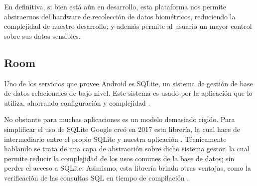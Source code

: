             En definitiva, si bien está aún en desarrollo, esta plataforma nos permite abstraernos del hardware de
            recolección de datos biométricos, reduciendo la complejidad de nuestro desarrollo; y además permite al 
            usuario un mayor control sobre sus datos sensibles.
            
        \subsection{Room}
            Uno de los servicios que provee Android es SQLite, un sistema de gestión de base de datos relacionales de 
            bajo nivel. Este sistema es usado por la aplicación que lo utiliza, ahorrando configuración y complejidad
            \cite{recio_persistencia_2019}. 
            
            No obstante para muchas aplicaciones es un modelo demasiado rígido. Para simplificar el uso de SQLite
            Google creó en 2017 esta librería, la cual hace de intermediario entre el propio SQLite y nuestra 
            aplicación \cite{leiva_room_2020}. Técnicamente hablando se trata de una capa de abstracción sobre dicho
            sistema gestor, la cual permite reducir la complejidad de los usos comunes de la base de datos; sin perder
            el acceso a SQLite. Asimismo, esta librería brinda otras ventajas, como la verificación de las consultas
            SQL en tiempo de compilación \cite{noauthor_como_nodate}.

